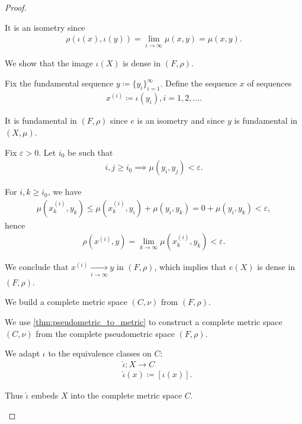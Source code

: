 \begin{proof}
\begin{defenum}
    It is an isometry since
    \begin{align*}
      \rho(\iota(x),\iota(y)) = \lim_{i \to \infty} \mu(x, y) = \mu(x, y).
    \end{align*}

    \item\label{thm:metric_space_completion_existence/part_d} We show that the image \( \iota(X) \) is dense in \( (F, \rho) \).

    Fix the fundamental sequence \( y \coloneqq \{ y_i \}_{i=1}^\infty \). Define the sequence \( x \) of sequences
    \begin{align*}
      x^{(i)} \coloneqq \iota(y_i), i = 1, 2, \ldots.
    \end{align*}

    It is fundamental in \( (F, \rho) \) since \( e \) is an isometry and since \( y \) is fundamental in \( (X, \mu) \).

    Fix \( \varepsilon > 0 \). Let \( i_0 \) be such that
    \begin{align*}
      i, j \geq i_0 \implies \mu(y_i, y_j) < \varepsilon.
    \end{align*}

    For \( i, k \geq i_0 \), we have
    \begin{align*}
      \mu(x_k^{(i)}, y_k)
      \leq
      \mu(x_k^{(i)}, y_i) + \mu(y_i, y_k)
      =
      0 + \mu(y_i, y_k)
      <
      \varepsilon,
    \end{align*}
    hence
    \begin{align*}
      \rho(x^{(i)}, y) = \lim_{k \to \infty} \mu(x_k^{(i)}, y_k) < \varepsilon.
    \end{align*}

    We conclude that \( x^{(i)} \xrightarrow[i \to \infty]{} y \) in \( (F, \rho) \), which implies that \( e(X) \) is dense in \( (F, \rho) \).

    \item\label{thm:metric_space_completion_existence/part_e} We build a complete metric space \( (C, \nu) \) from \( (F, \rho) \).

    We use \cref{thm:pseudometric_to_metric} to construct a complete metric space \( (C, \nu) \) from the complete pseudometric space \( (F, \rho) \).

    We adapt \( \iota \) to the equivalence classes on \( C \):
    \begin{align*}
      &\hat\iota: X \to C \\
      &\hat\iota(x) \coloneqq [\iota(x)].
    \end{align*}

    Thus \( \hat\iota \) embeds \( X \) into the complete metric space \( C \).
  \end{defenum}
\end{proof}


